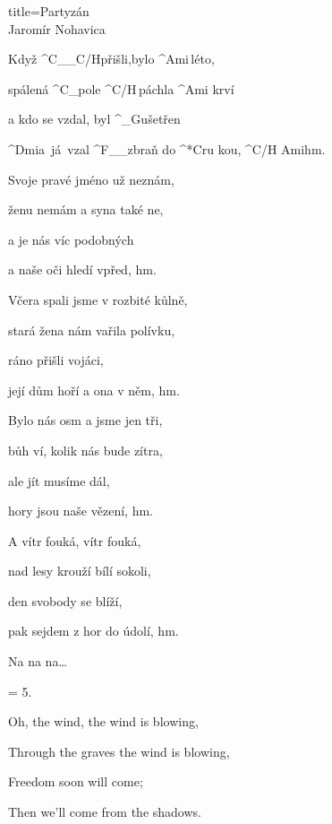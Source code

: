 \begin{song}{title=\predtitle\centering Partyzán  \\\large Jaromír Nohavica  \vspace*{-0.3cm}}  %
\begin{centerjustified}

\sloka 
	Když ^{C{\color{white}\_\_}C/H}přišli,\:bylo ^{Ami\,}léto,

	spálená ^{C{\color{white}\_}}pole ^{C/H{\color{white}\,\:}}páchla ^{Ami\,\,}krví

	a kdo se vzdal, byl ^{{\color{white}\_}G}ušetřen

	^{Dmi\z}a~já~vzal ^{F{\color{white}\_\_}}zbraň do ^*{C}ru kou, ^{C/H Ami}hm.\:\:\:\:\:\:\:\:\:\:\:\:

\sloka
	Svoje pravé jméno už neznám,
	
	ženu nemám a syna také ne,
	
	a je nás víc podobných
	
	a naše oči hledí vpřed, hm.

\sloka
	Včera spali jsme v rozbité kůlně,
	
	 stará žena nám vařila polívku,
	
	ráno přišli vojáci,
	
	její dům hoří a ona v něm, hm.

\sloka
	Bylo nás osm a jsme jen tři,
	
	bůh ví, kolik nás bude zítra,
	
	ale jít musíme dál,
	
	hory jsou naše vězení, hm.
	
\sloka
	A vítr fouká, vítr fouká,
	
	nad lesy krouží bílí sokoli,
	
	den svobody se blíží,
	
	pak sejdem z hor do údolí, hm.

\sloka
Na na na\elipsa\dots

\sloka = 5. 

\phantom{.}

Oh, the wind, the wind is blowing,

Through the graves the wind is blowing,

Freedom soon will come;

Then we'll come from the shadows.

\end{centerjustified}

\centering
{}

\setcounter{Slokočet}{0}
\end{song}
